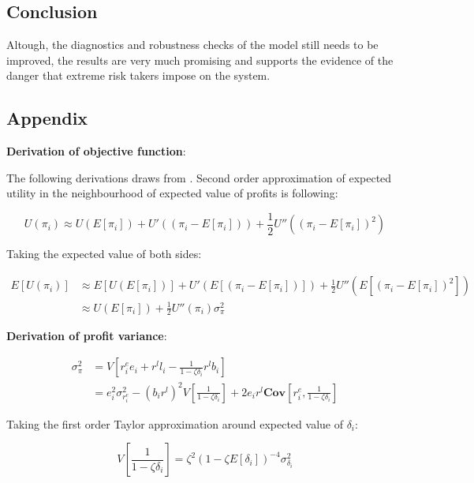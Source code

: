 \documentclass{article}
\begin{document}
\subsection*{Conclusion}

Altough, the diagnostics and robustness checks of the model still needs to be improved, the results are very much promising and supports the evidence of the danger that extreme risk takers impose on the system. 



\subsection*{Appendix}

\textbf{Derivation of objective function}:

The following derivations draws from \citet{aldasoro}. Second order approximation of expected utility in the neighbourhood of expected value of profits is following:

\[U(\pi_i) \approx U(E[\pi_i]) + U'((\pi_i - E[\pi_i])) + \frac{1}{2} U''((\pi_i - E[\pi_i])^2)\]

Taking the expected value of both sides:

\begin{equation}
  \begin{aligned}
    E[U(\pi_i)] &\approx E[U(E[\pi_i])] + U'(E[(\pi_i - E[\pi_i])]) + \frac{1}{2} U''(E[(\pi_i - E[\pi_i])^2]) \\
     &\approx U(E[\pi_i]) + \frac{1}{2} U''(\pi_i) \sigma^2_{\pi}
  \end{aligned}
\end{equation}

\textbf{Derivation of profit variance}:

\begin{equation}
  \begin{aligned}
    \sigma^2_\pi &= V[r^e_i e_i + r^l l_i - \frac{1}{1 - \zeta \delta_i} r^l b_i] \\
    &= e_i^2 \sigma^2_{r^e_i} - (b_i r^l)^2 V[\frac{1}{1 - \zeta \delta_i}] + 2 e_i r^l \textbf{Cov}[r^e_i, \frac{1}{1 - \zeta \delta_i}]
  \end{aligned}
\end{equation}

Taking the first order Taylor approximation around expected value of $\delta_i$:

\[V[\frac{1}{1 - \zeta \delta_i}] = \zeta^2 (1 - \zeta E[\delta_i])^{-4} \sigma^2_{\delta_i}\]
\end{document}

